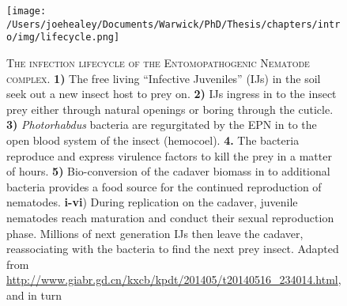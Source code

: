 \begin{figure}[h]
    \texttt{[image: /Users/joehealey/Documents/Warwick/PhD/Thesis/chapters/intro/img/lifecycle.png]}
    \captionsetup{singlelinecheck=off, justification=justified, font=footnotesize, aboveskip=10pt}
    \caption[Diagram of \emph{Photorhabdus} and \emph{Heterorhabditid} nematode infection cycle]{\textsc{\normalsize The infection lifecycle of the Entomopathogenic Nematode complex.}\vspace{0.1cm}\newline
\textbf{1)} The free living ``Infective Juveniles'' (IJs) in the soil seek out a new insect host to prey on. \textbf{2)} IJs ingress in to the insect prey either through natural openings or boring through the cuticle. \textbf{3)} \emph{Photorhabdus} bacteria are regurgitated by the EPN in to the open blood system of the insect (hemocoel). \textbf{4.} The bacteria reproduce and express virulence factors to kill the prey in a matter of hours. \textbf{5)} Bio-conversion of the cadaver biomass in to additional bacteria provides a food source for the continued reproduction of nematodes. \textbf{i-vi}) During replication on the cadaver, juvenile nematodes reach maturation and conduct their sexual reproduction phase. Millions of next generation IJs then leave the cadaver, reassociating with the bacteria to find the next prey insect. Adapted from \url{http://www.giabr.gd.cn/kxcb/kpdt/201405/t20140516_234014.html}, and in turn \citep{Ffrench-Constant2003}}
    
 \label{lifecyclefig}
\end{figure}

